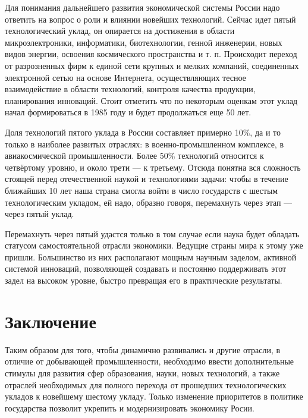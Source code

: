 \documentclass[a4paper,12pt]{article}
\begin{document}
Для понимания дальнейшего развития экономической системы России надо ответить
на вопрос о роли и влиянии новейших технологий. Сейчас идет пятый технологический уклад, 
он опирается на достижения в области микроэлектроники, информатики,
биотехнологии, генной инженерии, новых видов энергии, освоения космического пространства и т. п. 
Происходит переход от разрозненных фирм к единой сети крупных и мелких компаний, 
соединенных электронной сетью на основе Интернета, осуществляющих тесное взаимодействие 
в области технологий, контроля качества продукции, планирования инноваций. Стоит
отметить что по некоторым оценкам этот уклад начал формироваться в 1985 году и
будет продолжаться еще 50 лет.

Доля технологий пятого уклада в России составляет примерно 10\%, да и
то только в наиболее развитых отраслях: в военно-промышленном комплексе, в
авиакосмической промышленности. Более 50\% технологий относится к четвёртому
уровню, и около трети — к третьему. Отсюда понятна вся сложность стоящей
перед отечественной наукой и технологиями задачи: чтобы в течение ближайших 10 лет 
наша страна смогла войти в число государств с шестым технологическим укладом, 
ей надо, образно говоря, перемахнуть через этап — через пятый уклад.

Перемахнуть через пятый удастся только в том случае если наука будет обладать
статусом самостоятельной отрасли экономики. Ведущие страны мира к этому уже пришли.  
Большинство из них располагают мощным научным заделом, активной системой
инноваций, позволяющей создавать и постоянно поддерживать этот задел на высоком уровне, 
быстро превращая его в практические результаты.\cite{SixthTechn}

\section{Заключение}

Таким образом для того, чтобы динамично развивались и другие отрасли, в отличие
от добывающей промышленности, необходимо ввести дополнительные стимулы для
развития сфер образования, науки, новых технологий, а также отраслей
необходимых для полного перехода от прошедших технологических укладов к новейшему шестому укладу. 
Только изменение приоритетов в политике государства позволит укрепить и
модернизировать экономику Росии.

{}   %
\end{document}
